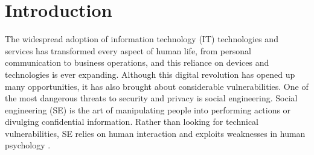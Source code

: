 



\chapter{Introduction\label{intro}}

The widespread adoption of information technology (IT) technologies and services has transformed every aspect of human life, from personal communication to business operations, and this reliance on devices and technologies is ever expanding. Although this digital revolution has opened up many opportunities, it has also brought about considerable vulnerabilities. One of the most dangerous threats to security and privacy is social engineering. Social engineering (SE) is the art of manipulating people into performing actions or divulging confidential information. Rather than looking for technical vulnerabilities, SE relies on human interaction and exploits weaknesses in human psychology \citep{wang_defining_2020}.




